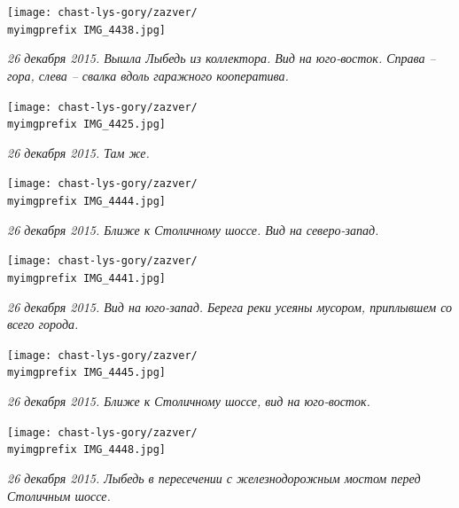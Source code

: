 \begin{center}
\texttt{[image: chast-lys-gory/zazver/\\myimgprefix IMG\_4438.jpg]}

\textit{26 декабря 2015. Вышла Лыбедь из коллектора. Вид на юго-восток. Справа – гора, слева – свалка вдоль гаражного кооператива.}
\end{center}

\newpage


\begin{center}
\texttt{[image: chast-lys-gory/zazver/\\myimgprefix IMG\_4425.jpg]}

\textit{26 декабря 2015. Там же.}
\end{center}


\begin{center}
\texttt{[image: chast-lys-gory/zazver/\\myimgprefix IMG\_4444.jpg]}

\textit{26 декабря 2015. Ближе к Столичному шоссе. Вид на северо-запад.}
\end{center}

\newpage
\vspace*{\fill}
\begin{center}
\texttt{[image: chast-lys-gory/zazver/\\myimgprefix IMG\_4441.jpg]}

\textit{26 декабря 2015. Вид на юго-запад. Берега реки усеяны мусором, приплывшем со всего города.}
\end{center}
\vspace*{\fill}
\newpage

\begin{center}
\texttt{[image: chast-lys-gory/zazver/\\myimgprefix IMG\_4445.jpg]}

\textit{26 декабря 2015. Ближе к Столичному шоссе, вид на юго-восток.}
\end{center}


\begin{center}
\texttt{[image: chast-lys-gory/zazver/\\myimgprefix IMG\_4448.jpg]}

\textit{26 декабря 2015. Лыбедь в пересечении с железнодорожным мостом перед Столичным шоссе.}
\end{center}

\newpage

